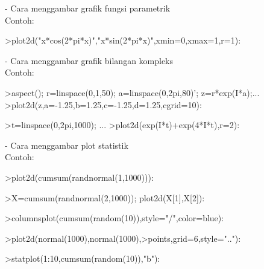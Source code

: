 \documentclass[a4paper,10pt]{article}
\begin{document}
\begin{eulernotebook}
\begin{eulercomment}
\begin{eulercomment}
\begin{eulercomment}
- Cara menggambar grafik fungsi parametrik\\
Contoh:
\end{eulercomment}
\begin{eulerprompt}
>plot2d("x*cos(2*pi*x)","x*sin(2*pi*x)",xmin=0,xmax=1,r=1):
\end{eulerprompt}
\begin{eulercomment}
- Cara menggambar grafik bilangan kompleks\\
Contoh:
\end{eulercomment}
\begin{eulerprompt}
>aspect(); r=linspace(0,1,50); a=linspace(0,2pi,80)'; z=r*exp(I*a);...
>plot2d(z,a=-1.25,b=1.25,c=-1.25,d=1.25,cgrid=10):
\end{eulerprompt}
\begin{eulerprompt}
>t=linspace(0,2pi,1000); ...
>plot2d(exp(I*t)+exp(4*I*t),r=2):
\end{eulerprompt}
\begin{eulercomment}
- Cara menggambar plot statistik\\
Contoh:
\end{eulercomment}
\begin{eulerprompt}
>plot2d(cumsum(randnormal(1,1000))):
\end{eulerprompt}
\begin{eulerprompt}
>X=cumsum(randnormal(2,1000)); plot2d(X[1],X[2]):
\end{eulerprompt}
\begin{eulerprompt}
>columnsplot(cumsum(random(10)),style="/",color=blue):
\end{eulerprompt}
\begin{eulerprompt}
>plot2d(normal(1000),normal(1000),>points,grid=6,style=".."):
\end{eulerprompt}
\begin{eulerprompt}
>statplot(1:10,cumsum(random(10)),"b"):
\end{eulerprompt}

\end{eulercomment}
\end{eulercomment}
\end{eulernotebook}
\end{document}
